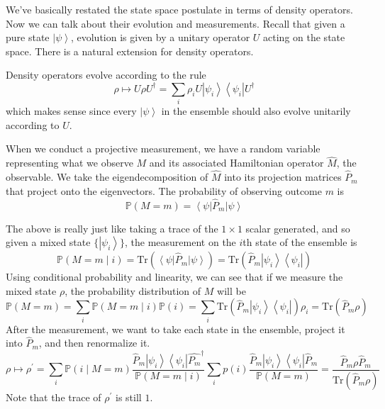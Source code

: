 \documentclass{article}
\newcommand{\ket}[1]{\ensuremath{\left|#1\right\rangle}}
\newcommand{\bra}[1]{\ensuremath{\left\langle#1\right|}}
\begin{document}
    We've basically restated the state space postulate in terms of density operators. Now we can talk about their evolution and measurements. Recall that given a pure state $\ket{\psi}$, evolution is given by a unitary operator $U$ acting on the state space. There is a natural extension for density operators. 

    \begin{lemma}
      Density operators evolve according to the rule 
      \begin{equation} 
        \rho \mapsto U \rho U^\dagger = \sum_i \rho_i U \ket{\psi_i} \bra{\psi_i} U^\dagger
      \end{equation}
      which makes sense since every $\ket{\psi}$ in the ensemble should also evolve unitarily according to $U$. 
    \end{lemma}

    When we conduct a projective measurement, we have a random variable representing what we observe $M$ and its associated Hamiltonian operator $\hat{M}$, the observable. We take the eigendecomposition of $\hat{M}$ into its projection matrices $\hat{P}_m$ that project onto the eigenvectors. The probability of observing outcome $m$ is 
    \begin{equation}
      \mathbb{P}(M = m) = \bra{\psi} \hat{P}_m \ket{\psi} 
    \end{equation}

    \begin{lemma}
      The above is really just like taking a trace of the $1 \times 1$ scalar generated, and so given a mixed state $\{ \ket{\psi_i}\}$, the measurement on the $i$th state of the ensemble is 
      \begin{equation}
        \mathbb{P}(M = m \mid i) = \mathrm{Tr}(\bra{\psi} \hat{P}_m \ket{\psi}) = \mathrm{Tr}( \hat{P}_m \ket{\psi_i} \bra{\psi_i}) 
      \end{equation}
      Using conditional probability and linearity, we can see that if we measure the mixed state $\rho$, the probability distribution of $M$ will be 
      \begin{equation}
        \mathbb{P}(M = m) = \sum_i \mathbb{P}(M = m \mid i) \mathbb{P}(i) = \sum_i \mathrm{Tr}(\hat{P}_m \ket{\psi_i} \bra{\psi_i}) \rho_i = \mathrm{Tr}(\hat{P}_m \rho) 
      \end{equation}
      After the measurement, we want to take each state in the ensemble, project it into $\hat{P}_m$, and then renormalize it. 
      \begin{equation}
        \rho \mapsto \rho^\prime = \sum_i \mathbb{P}(i \mid M = m) \frac{\hat{P}_m \ket{\psi_i} \bra{\psi_i} \hat{P_m}^\dagger}{\mathbb{P}(M = m \mid i)} \sum_i p(i) \frac{\hat{P}_m \ket{\psi_i} \bra{\psi_i} \hat{P}_m}{\mathbb{P}(M = m)} = \frac{\hat{P}_m \rho \hat{P}_m}{\mathrm{Tr}(\hat{P}_m \rho)} 
      \end{equation}
      Note that the trace of $\rho^\prime$ is still $1$. 
    \end{lemma}
\end{document}
